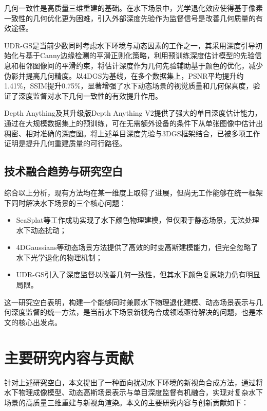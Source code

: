 几何一致性是高质量三维重建的基础。在水下场景中，光学退化效应使得基于像素一致性的几何优化更为困难，引入外部深度先验作为监督信号是改善几何质量的有效途径。

UDR-GS是当前少数同时考虑水下环境与动态因素的工作之一，其采用深度引导初始化与基于Canny边缘检测的平滑正则化策略，利用预训练深度估计模型的先验信息和相邻图像间的平滑约束，将估计深度作为几何先验辅助基于颜色的优化，减少伪影并提高几何精度。以4DGS为基线，在多个数据集上，PSNR平均提升约1.41\%，SSIM提升0.75\%，显著增强了水下动态场景的视觉质量和几何保真度，验证了深度监督对水下几何一致性的有效提升作用。

Depth Anything及其升级版Depth Anything V2提供了强大的单目深度估计能力，通过在大规模数据集上的预训练，可在无需额外设备的条件下从单张图像中估计出稠密、相对准确的深度图。将上述单目深度先验与3DGS框架结合，已被多项工作证明是提升几何重建质量的可行路径。

\subsection{技术融合趋势与研究空白}

综合以上分析，现有方法均在某一维度上取得了进展，但尚无工作能够在统一框架下同时解决水下场景的三个核心问题：

\begin{itemize}
    \item SeaSplat等工作成功实现了水下颜色物理建模，但仅限于静态场景，无法处理水下动态扰动；
    \item 4DGaussians等动态场景方法提供了高效的时变高斯建模能力，但完全忽略了水下光学退化的物理机制；
    \item UDR-GS引入了深度监督以改善几何一致性，但其水下颜色复原能力仍有明显局限。
\end{itemize}

这一研究空白表明，构建一个能够同时兼顾水下物理退化建模、动态场景表示与几何深度监督的统一方法，是当前水下场景新视角合成领域亟待解决的问题，也是本文的核心出发点。

\section{主要研究内容与贡献}

针对上述研究空白，本文提出了一种面向扰动水下环境的新视角合成方法，通过将水下物理成像模型、动态高斯场景表示与单目深度监督有机融合，实现对复杂水下场景的高质量三维重建与新视角渲染。本文的主要研究内容与创新贡献如下：

